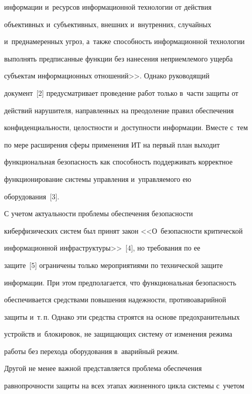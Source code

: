 информации и~ресурсов информационной технологии от действия 


объективных и~субъективных, внешних и~внутренних, случайных 


и~преднамеренных угроз, а~также способность информационной технологии 


выполнять предписанные функции без нанесения неприемлемого ущерба 


субъектам информационных отношений>>. Однако руководящий 


документ~[2] предусматривает проведение работ только в~части защиты от 


действий нарушителя, направленных на преодоление правил обеспечения 


конфиденциальности, целостности и~доступности информации. Вместе с~тем 


по мере расширения сферы применения ИТ на первый план выходит 


функциональная безопасность как способность поддерживать корректное 


функционирование системы управления и~управляемого ею 


оборудования~[3]. 


     


     С учетом актуальности проблемы обеспечения безопасности 


киберфизических систем был принят закон <<О~безопасности критической 


информационной инфраструктуры>>~[4], но требования по ее 


защите~[5] ограничены только мероприятиями по технической защите 


информации. При этом предполагается, что функциональная безопасность 


обеспечивается средствами повышения надежности, противоаварийной 


защиты и~т.\,п. Однако эти средства строятся на основе предохранительных 


устройств и~блокировок, не защищающих систему от изменения режима 


работы без перехода оборудования в~аварийный режим. 


     


     Другой не менее важной представляется проблема обеспечения 


рав\-но\-проч\-ности защиты на всех этапах жизненного цикла системы с~учетом 


